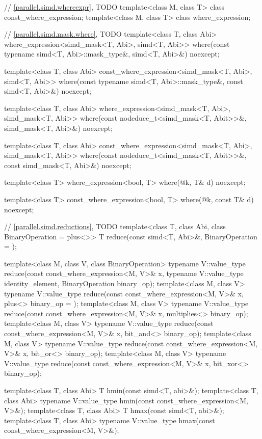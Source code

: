 \begin{codeblock}
{{    // \ref{parallel.simd.whereexpr}, TODO
    template<class M, class T> class const_where_expression;
    template<class M, class T> class where_expression;

    // \ref{parallel.simd.mask.where}, TODO
    template<class T, class Abi>
    where_expression<simd_mask<T, Abi>, simd<T, Abi>>
    where(const typename simd<T, Abi>::mask_type&, simd<T, Abi>&) noexcept;

    template<class T, class Abi>
    const_where_expression<simd_mask<T, Abi>, simd<T, Abi>>
    where(const typename simd<T, Abi>::mask_type&, const simd<T, Abi>&) noexcept;

    template<class T, class Abi>
    where_expression<simd_mask<T, Abi>, simd_mask<T, Abi>>
    where(const nodeduce_t<simd_mask<T, Abit>>&, simd_mask<T, Abi>&) noexcept;

    template<class T, class Abi>
    const_where_expression<simd_mask<T, Abi>, simd_mask<T, Abi>>
    where(const nodeduce_t<simd_mask<T, Abit>>&, const simd_mask<T, Abi>&) noexcept;

    template<class T>
    where_expression<bool, T>
    where(@\seebelow@ k, T& d) noexcept;

    template<class T>
    const_where_expression<bool, T>
    where(@\seebelow@ k, const T& d) noexcept;

    // \ref{parallel.simd.reductions}, TODO
    template<class T, class Abi, class BinaryOperation = plus<>>
    T reduce(const simd<T, Abi>&,
    BinaryOperation = {});

    template<class M, class V, class BinaryOperation>
    typename V::value_type reduce(const const_where_expression<M, V>& x,
    typename V::value_type identity_element,
    BinaryOperation binary_op);
    template<class M, class V>
    typename V::value_type reduce(const const_where_expression<M, V>& x,
    plus<>
    binary_op = {});
    template<class M, class V>
    typename V::value_type reduce(const const_where_expression<M, V>& x,
    multiplies<>
    binary_op);
    template<class M, class V>
    typename V::value_type reduce(const const_where_expression<M, V>& x,
    bit_and<>
    binary_op);
    template<class M, class V>
    typename V::value_type reduce(const const_where_expression<M, V>& x,
    bit_or<>
    binary_op);
    template<class M, class V>
    typename V::value_type reduce(const const_where_expression<M, V>& x,
    bit_xor<>
    binary_op);

    template<class T, class Abi>
    T hmin(const simd<T, abi>&);
    template<class T, class Abi>
    typename V::value_type hmin(const const_where_expression<M, V>&);
    template<class T, class Abi>
    T hmax(const simd<T, abi>&);
    template<class T, class Abi>
    typename V::value_type hmax(const const_where_expression<M, V>&);

}}
\end{codeblock}
